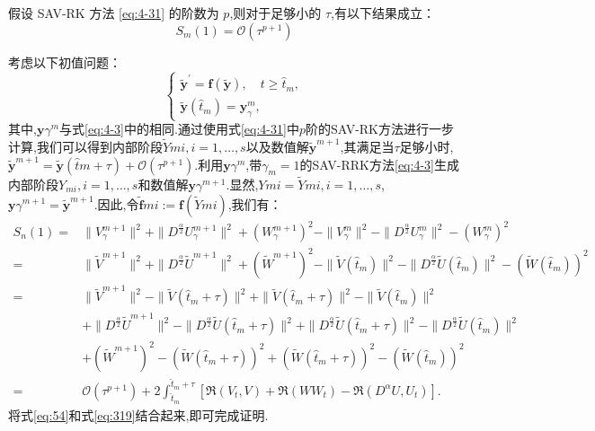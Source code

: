 \begin{lem}\label{lem:5_1}
	假设 SAV-RK 方法 \eqref{eq:4-31} 的阶数为 $p$,则对于足够小的 $\tau$,有以下结果成立：
    \begin{equation}
S_m(1)=\mathcal{O}\left(\tau^{p+1}\right)
\end{equation}
\end{lem} 
\begin{pf}
	考虑以下初值问题：
\begin{equation}
\left\{\begin{array}{l}
\tilde{\bm{y}}^{\prime}=\bm{f}(\tilde{\bm{y}}), \quad t \geq \hat{t}_m, \\
\tilde{\bm{y}}\left(\hat{t}_m\right)=\bm{y}_\gamma^m,
\end{array}\right.
\end{equation}
其中,$\bm{y}\gamma^m$与式\eqref{eq:4-3}中的相同.通过使用式\eqref{eq:4-31}中$p$阶的SAV-RK方法进行一步计算,我们可以得到内部阶段$\tilde{Y}{m i}, i=1, \ldots, s$以及数值解$\tilde{\bm{y}}^{m+1}$,其满足当$\tau$足够小时,$\tilde{\bm{y}}^{m+1}=\tilde{\bm{y}}\left(\hat{t}m+\tau\right)+\mathcal{O}\left(\tau^{p+1}\right)$.利用$\bm{y}\gamma^m$,带$\gamma_m=1$的SAV-RRK方法\eqref{eq:4-3}生成内部阶段$Y_{m i}, i=1, \ldots, s$和数值解$\bm{y}\gamma^{m+1}$.显然,$Y{m i}=\tilde{Y}{m i}, i=1, \ldots, s$,$\bm{y}\gamma^{m+1}=\tilde{\bm{y}}^{m+1}$.因此,令$\tilde{\bm{f}}{m i}:=\bm{f}\left(\tilde{Y}{m i}\right)$,我们有：
\begin{equation}
\begin{aligned}
S_n(1) = &\|V_\gamma^{m+1}\|^2 + \|D^\frac{\alpha}{2} U_\gamma^{m+1}\|^2+\left(W_\gamma^{m+1}\right)^2-\|V_\gamma^{m}\|^2 - \|D^\frac{\alpha}{2} U_\gamma^{m}\|^2-\left(W_\gamma^{m}\right)^2 \\
= &\|\tilde{V}^{m+1}\|^2 + \|D^\frac{\alpha}{2} \tilde{U}^{m+1}\|^2+\left(\tilde{W}^{m+1}\right)^2-\|\tilde{V}(\hat{t}_{m})\|^2 - \|D^\frac{\alpha}{2} \tilde{U}(\hat{t}_{m})\|^2-\left(\tilde{W}(\hat{t}_{m})\right)^2 \\
= &\|\tilde{V}^{m+1}\|^2 -\|\tilde{V}(\hat{t}_{m}+\tau)\|^2 +\|\tilde{V}(\hat{t}_{m}+\tau)\|^2-\|\tilde{V}(\hat{t}_{m})\|^2\\
& + \|D^\frac{\alpha}{2} \tilde{U}^{m+1}\|^2 -\|D^\frac{\alpha}{2} \tilde{U}(\hat{t}_{m}+\tau)\|^2+\|D^\frac{\alpha}{2} \tilde{U}(\hat{t}_{m}+\tau)\|^2- \|D^\frac{\alpha}{2} \tilde{U}(\hat{t}_{m})\|^2\\
& +\left(\tilde{W}^{m+1}\right)^2 -\left(\tilde{W}(\hat{t}_{m}+\tau)\right)^2+\left(\tilde{W}(\hat{t}_{m}+\tau)\right)^2-\left(\tilde{W}(\hat{t}_{m})\right)^2 \\
= &\mathcal{O}\left(\tau^{p+1}\right) +2\int_{\hat{t}_m}^{\hat{t}_m+\tau}\left[\Re\left(V_t, V\right) + \Re\left(W W_t\right) - \Re\left(D^{\alpha} U, U_t\right)\right].
\end{aligned}\label{eq:54}
\end{equation}
将式\eqref{eq:54}和式\eqref{eq:319}结合起来,即可完成证明.
\end{pf} 
